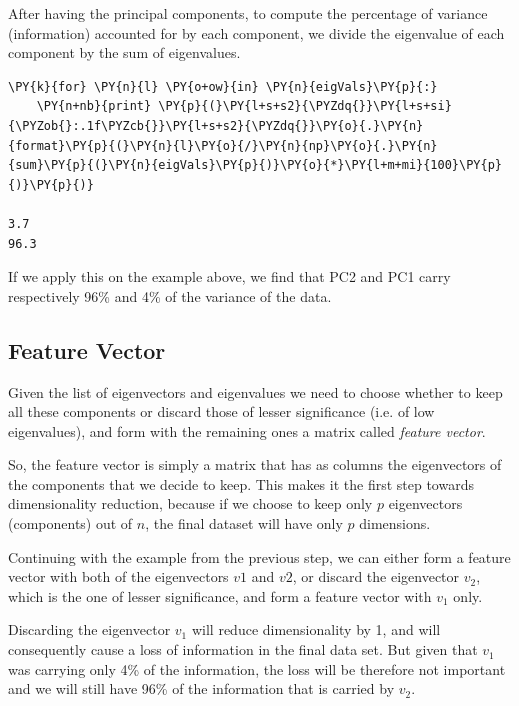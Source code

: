 After having the principal components, to compute the percentage of variance (information) accounted for by each component, we divide the eigenvalue of each component by the sum of eigenvalues. 

\begin{tcolorbox}[breakable, size=fbox, boxrule=1pt, pad at break*=1mm,colback=cellbackground, colframe=cellborder]
\begin{Verbatim}[commandchars=\\\{\}]
\PY{k}{for} \PY{n}{l} \PY{o+ow}{in} \PY{n}{eigVals}\PY{p}{:}
    \PY{n+nb}{print} \PY{p}{(}\PY{l+s+s2}{\PYZdq{}}\PY{l+s+si}{\PYZob{}:.1f\PYZcb{}}\PY{l+s+s2}{\PYZdq{}}\PY{o}{.}\PY{n}{format}\PY{p}{(}\PY{n}{l}\PY{o}{/}\PY{n}{np}\PY{o}{.}\PY{n}{sum}\PY{p}{(}\PY{n}{eigVals}\PY{p}{)}\PY{o}{*}\PY{l+m+mi}{100}\PY{p}{)}\PY{p}{)}
		
3.7
96.3
\end{Verbatim}
\end{tcolorbox}

If we apply this on the example above, we find that PC2 and PC1 carry respectively 96\% and 4\% of the variance of the data.

\subsection{Feature Vector}
Given the list of eigenvectors and eigenvalues we need to choose
whether to keep all these components or discard those of lesser significance (i.e. of low eigenvalues), and form with the remaining ones a matrix called \emph{feature vector}.

So, the feature vector is simply a matrix that has as columns the eigenvectors of the components that we decide to keep. This makes it the first step towards dimensionality reduction, because if we choose to keep only $p$ eigenvectors (components) out of $n$, the final dataset 
will have only $p$ dimensions.

Continuing with the example from the previous step, we can either form a feature vector with both of the eigenvectors $v1$ and $v2$, 
or discard the eigenvector $v_2$, which is the one of lesser significance, and form a feature vector with $v_1$ only.

Discarding the eigenvector $v_1$ will reduce dimensionality by 1, and will consequently cause a loss of information in the final data set. But given that $v_1$ was carrying only 4\% of the information, the loss will be therefore not important and we will still have 96\% of the information that is carried by $v_2$.

